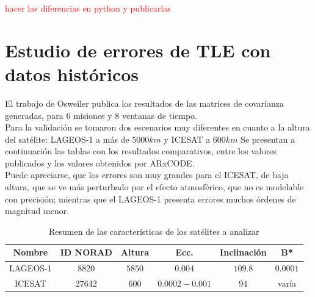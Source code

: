 \begin{table}[!h]
\centering
{}
\caption{Resultados del Systems Tool Kit (STK) propagando el mismo TLE que ARxCODE.}
\end{table}


\textcolor{red}{hacer las diferencias en python y publicarlas}

\section{Estudio de errores de TLE con datos hist\'oricos}

El trabajo de Osweiler publica los resultados de las matrices de covarianza generadas, para 6 misiones y 8 ventanas de tiempo.\\
Para la validaci\'on se tomaron dos escenarios muy diferentes en cuanto a la altura del sat\'elite: LAGEOS-1 a m\'as de $5000 km$ y ICESAT a $600 km$
Se presentan a continuaci\'on las tablas con los resultados comparativos, entre los valores publicados y los valores obtenidos por ARxCODE.\\
Puede apreciarse, que los errores son muy grandes para el ICESAT, de baja altura, que se ve m\'as perturbado por el efecto atmosf\'erico, que no es modelable con precisión; mientras que el LAGEOS-1 presenta errores muchos \'ordenes de magnitud menor.\\

\begin{table}
 \centering
      \begin{tabular}{cccccc}
      \hline
      Nombre & ID NORAD & Altura & Ecc. & Inclinaci\'on & B* \\
      \hline
      LAGEOS-1 & 8820 & $5850$ & $0.004$ & $109.8$ & $0.0001$ \\
      ICESAT & 27642 & $600$ & $0.0002 - 0.001$ & $94$ & var\'ia \\
      \hline
      \end{tabular}
    \caption[Sat\'elites de Estudio]{Resumen de las caracter\'isticas de los sat\'elites a analizar}
\end{table}

